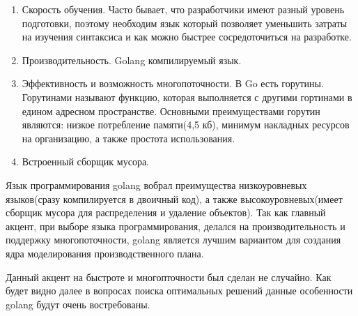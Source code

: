 \begin{enumerate}
    \item Скорость обучения. Часто бывает, что разработчики имеют разный уровень подготовки, поэтому необходим язык который позволяет уменьшить затраты на изучения синтаксиса и как можно быстрее сосредоточиться на разработке. 
    \item Производительность. Golang компилируемый язык. 
    \item Эффективность и возможность многопоточности. В Go есть горутины. Горутинами называют функцию, которая выполняется с другими гортинами в едином адресном пространстве. Основными преимуществами горутин являются: низкое потребление памяти(4,5 кб), минимум накладных ресурсов на организацию, а также простота использования.
    \item Встроенный сборщик мусора.
\end{enumerate}

Язык программирования golang вобрал преимущества низкоуровневых языков(сразу компилируется в двоичный код), а также высокоуровневых(имеет сборщик мусора для распределения и удаление объектов). Так как главный акцент, при выборе языка программирования, делался на производительность и поддержку многопоточности, golang является лучшим вариантом для создания ядра моделирования производственного плана. 

Данный акцент на быстроте и многопточности был сделан не случайно. Как будет видно далее в вопросах поиска оптимальных решений данные особенности golang будут очень востребованы.
